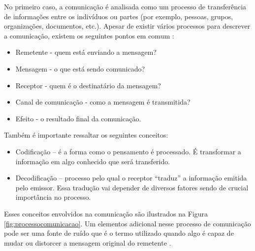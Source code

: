 No primeiro caso, a comunicação é analisada como um processo de transferência de informações entre os indivíduos ou partes (por exemplo, pessoas, grupos, organizações, documentos, etc.). Apesar de existir vários processos para descrever a comunicação, existem os seguintes pontos em comum \cite{pernstal}:

\begin{itemize}
    \item Remetente - quem está enviando a mensagem? 
    \item Mensagem - o que está sendo comunicado?
    \item Receptor - quem é o destinatário da mensagem?
    \item Canal de comunicação - como a mensagem é transmitida?
    \item Efeito - o resultado final da comunicação.
\end{itemize}

Também é importante ressaltar os seguintes conceitos:

\begin{itemize}
    \item Codificação – é a forma como o pensamento é processado. É transformar a informação em algo conhecido que será transferido.
    \item Decodificação – processo pelo qual o receptor ``traduz'' a informação emitida pelo emissor. Essa tradução vai depender de diversos fatores sendo de crucial importância no processo.
\end{itemize}

Esses conceitos envolvidos na comunicação são ilustrados na Figura \ref{fig:processocomunicacao}. Um elementos adicional nesse processo de comunicação pode ser uma fonte de ruído que é o termo utilizado quando algo é capaz de mudar ou distorcer a mensagem original do remetente \cite{pernstal}. 

\begin{figure}[h!] 
   	    \captionsetup{width=13cm}%
	\end{figure}




